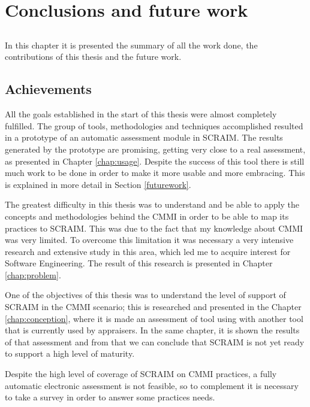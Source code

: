 \chapter{Conclusions and future work} \label{chap:conclusion}

\section*{}
In this chapter it is presented the summary of all the work done, the contributions of this thesis  and the future work.

\section{Achievements}

All the goals established in the start of this thesis were almost completely fulfilled. The group of tools, methodologies and techniques accomplished resulted in a prototype of an automatic assessment module in SCRAIM. The results generated by the prototype are promising, getting very close to a real assessment, as presented in Chapter \ref{chap:usage}. Despite the success of this tool there is still much work to be done in order to make it more usable and more embracing. This is explained in more detail in Section \ref{futurework}.

The greatest difficulty in this thesis was to understand and be able to apply the concepts and methodologies behind the CMMI in order to be able to map its practices to SCRAIM. This was due to the fact that my knowledge about CMMI was very limited. To overcome this limitation it was necessary a very intensive research and extensive study in this area, which led me to acquire interest for Software Engineering. The result of this research is presented in Chapter \ref{chap:problem}.

One of the objectives of this thesis was to understand the level of support of SCRAIM in the CMMI scenario; this is researched and presented in the Chapter \ref{chap:conception}, where it is made an assessment of tool using with another tool that is currently used by appraisers. In the same chapter, it is shown the results of that assessment and from that we can conclude that SCRAIM is not yet ready to support a high level of maturity.

Despite the high level of coverage of SCRAIM on CMMI practices, a fully automatic electronic assessment is not feasible, so to complement it is necessary to take a survey in order to answer some practices needs. 

